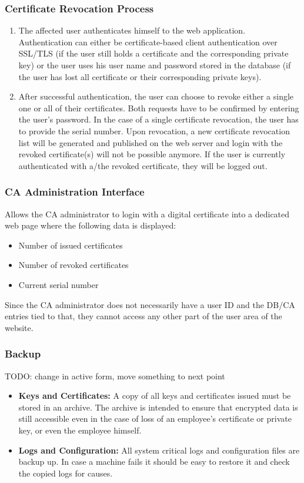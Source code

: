 \documentclass[english]{article}
\begin{document}
\subsubsection{Certificate Revocation Process}
\begin{enumerate}
\item The affected user authenticates himself to the web application. Authentication can either be certificate-based client authentication over SSL/TLS (if the user still holds a certificate and the corresponding private key) or the user
uses his user name and password stored in the database (if the user has lost all certificate or their corresponding private keys).
\item After successful authentication, the user can choose to revoke either a single one or all of their certificates. Both requests have to be confirmed by entering the user's password. In the case of a single certificate revocation,
the user has to provide the serial number. Upon revocation, a new certificate revocation list will be generated and published on the web server and login with the revoked certificate(s) will not be possible anymore. If the user is currently
authenticated with a/the revoked certificate, they will be logged out.
\end{enumerate}

\subsubsection{CA Administration Interface}
Allows the CA administrator to login with a digital certificate into a dedicated web page where the following data is displayed:
\begin{itemize}
\item Number of issued certificates
\item Number of revoked certificates
\item Current serial number
\end{itemize}
Since the CA administrator does not necessarily  have a user ID and the DB/CA entries tied to that, they cannot access any other part of the user area
of the website.

\subsubsection{Backup}
TODO: change in active form, move something to next point
\begin{itemize}
\item \textbf{Keys and Certificates:} A copy of all keys and certificates issued must be stored in an archive. The archive is intended to ensure that encrypted data is still accessible even in the
case of loss of an employee’s certificate or private key, or even the employee
himself.
\item \textbf{Logs and Configuration:} All system critical logs and configuration files are backup up. In case a machine fails it should be easy to restore it and check the copied logs for causes.
\end{itemize}
\end{document}
